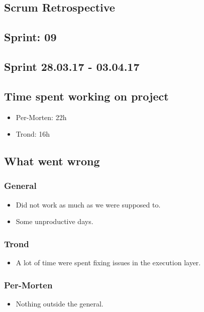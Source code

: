 \documentclass{article}
\begin{document}
\begin{center}
\section*{Scrum Retrospective}
\subsection*{Sprint: 09}
\subsection*{Sprint 28.03.17 - 03.04.17}
\end{center}
\bigskip

\subsection*{Time spent working on project}
\begin{itemize}
    \item
    Per-Morten: 22h

    \item
    Trond:      16h
\end{itemize}

\subsection*{What went wrong}
\subsubsection*{General}
\begin{itemize}
    \item
    Did not work as much as we were supposed to.

    \item
    Some unproductive days.
\end{itemize}

\subsubsection*{Trond}
\begin{itemize}
    \item
     A lot of time were spent fixing issues in the execution layer.
\end{itemize}

\subsubsection*{Per-Morten}
\begin{itemize}
    \item
     Nothing outside the general.
\end{itemize}
\end{document}
